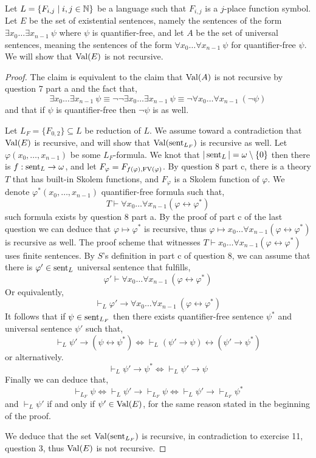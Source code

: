 \question{}
Let $L = \{ F_{i, j} \mid i, j \in \mathbb{N} \}$ be a language such that $F_{i, j}$ is a $j$-place function symbol.
Let $E$ be the set of existential sentences, namely the sentences of the form $\exists x_0 \ldots \exists x_{n - 1}\ \psi$ where $\psi$ is quantifier-free,
and let $A$ be the set of universal sentences, meaning the sentences of the form $\forall x_0 \ldots \forall x_{n - 1}\ \psi$ for quantifier-free $\psi$. \\
We will show that $\operatorname{Val}(E)$ is not recursive.
\begin{proof}
	The claim is equivalent to the claim that $\operatorname{Val}(A)$ is not recursive by question 7 part a and the fact that,
	\[
		\exists x_0 \ldots \exists x_{n - 1}\ \psi
		\equiv \lnot \lnot \exists x_0 \ldots \exists x_{n - 1}\ \psi
		\equiv \lnot \forall x_0 \ldots \forall x_{n - 1}\ (\lnot \psi)
	\]
	and that if $\psi$ is quantifier-free then $\lnot \psi$ is as well.

	Let $L_F = \{ F_{0, 2} \} \subseteq L$ be reduction of $L$.
	We assume toward a contradiction that $\operatorname{Val}(E)$ is recursive, and will show that $\operatorname{Val}(\operatorname{sent}_{L_F})$ is recursive as well.
	Let $\varphi(x_0, \ldots, x_{n - 1})$ be some $L_F$-formula.
	We knot that $|\operatorname{sent}_L| = \omega \setminus \{ 0 \}$ then there is $f : \operatorname{sent}_L \to \omega$, and let $F_{\varphi} = F_{f(\varphi), \operatorname{FV}(\varphi)}$.
	By question 8 part c, there is a theory $T$ that has built-in Skolem functions, and $F_{\varphi}$ is a Skolem function of $\varphi$.
	We denote $\varphi^*(x_0, \ldots, x_{n - 1})$ quantifier-free formula such that,
	\[
		T \vdash \forall x_0 \ldots \forall x_{n - 1} (\varphi \leftrightarrow \varphi^*)
	\]
	such formula exists by question 8 part a.
	By the proof of part c of the last question we can deduce that $\varphi \mapsto \varphi^*$ is recursive, thus $\varphi \mapsto x_0 \ldots \forall x_{n - 1} (\varphi \leftrightarrow \varphi^*)$ is recursive as well.
	The proof scheme that witnesses $T \vdash x_0 \ldots \forall x_{n - 1} (\varphi \leftrightarrow \varphi^*)$ uses finite sentences.
	By $S$'s definition in part c of question 8, we can assume that there is $\varphi' \in \operatorname{sent}_L$ universal sentence that fulfills,
	\[
		\varphi' \vdash \forall x_0 \ldots \forall x_{n - 1}\ (\varphi \leftrightarrow \varphi^*)
	\]
	Or equivalently,
	\[
		\vdash_L \varphi' \to \forall x_0 \ldots \forall x_{n - 1}\ (\varphi \leftrightarrow \varphi^*)
	\]
	It follows that if $\psi \in \operatorname{sent}_{L_F}$ then there exists quantifier-free sentence $\psi^*$ and universal sentence $\psi'$ such that,
	\[
		\vdash_L \psi' \to (\psi \leftrightarrow \psi^*)
		\iff \vdash_L (\psi' \to \psi) \leftrightarrow (\psi' \to \psi^*)
	\]
	or alternatively.
	\[
		\vdash_L \psi' \to \psi^*
		\iff \vdash_L \psi' \to \psi
	\]
	Finally we can deduce that,
	\[
		\vdash_{L_F} \psi
		\iff \vdash_L \psi' \to \vdash_{L_F} \psi
		\iff \vdash_L \psi' \to \vdash_{L_F} \psi^*
	\]
	and $\vdash_L \psi'$ if and only if $\psi' \in \operatorname{Val}(E)$, for the same reason stated in the beginning of the proof.

	We deduce that the set $\operatorname{Val}(\operatorname{sent}_{L_F})$ is recursive, in contradiction to exercise 11, question 3, thus $\operatorname{Val}(E)$ is not recursive.
\end{proof}

